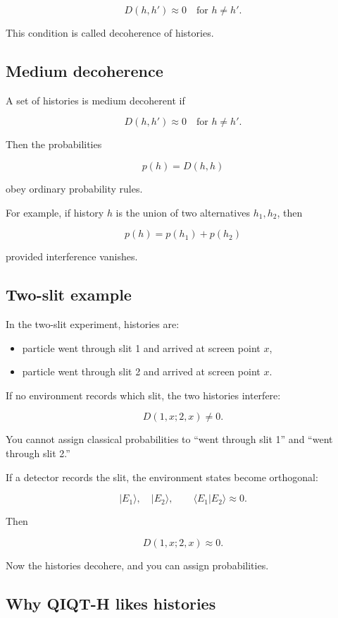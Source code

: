 \documentclass[11pt,a4paper]{article}
\begin{document}
\[
D(h,h')\approx 0
\quad
\text{for } h\neq h'.
\]

This condition is called decoherence of histories.

\subsection{Medium decoherence}

A set of histories is medium decoherent if

\[
D(h,h')\approx 0
\quad
\text{for } h\neq h'.
\]

Then the probabilities

\[
p(h)=D(h,h)
\]

obey ordinary probability rules.

For example, if history $h$ is the union of two alternatives $h_1,h_2$, then

\[
p(h)=p(h_1)+p(h_2)
\]

provided interference vanishes.

\subsection{Two-slit example}

In the two-slit experiment, histories are:

\begin{itemize}
  \item particle went through slit 1 and arrived at screen point $x$,
  \item particle went through slit 2 and arrived at screen point $x$.
\end{itemize}

If no environment records which slit, the two histories interfere:

\[
D(1,x;2,x)\neq 0.
\]

You cannot assign classical probabilities to “went through slit 1” and “went through slit 2.”

If a detector records the slit, the environment states become orthogonal:

\[
|E_1\rangle,\quad |E_2\rangle,
\qquad
\langle E_1|E_2\rangle\approx 0.
\]

Then

\[
D(1,x;2,x)\approx 0.
\]

Now the histories decohere, and you can assign probabilities.

\subsection{Why QIQT-H likes histories}
\end{document}
